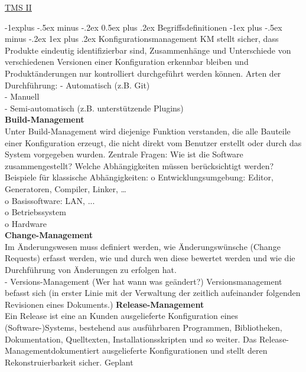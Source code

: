 \documentclass[5pt]{article}
\makeatletter
\renewcommand{\subsection}{\@startsection{subsection}{2}{0mm}%
                                {-1explus -.5ex minus -.2ex}%
                                {0.5ex plus .2ex}%
                                {\normalfont\normalsize\bfseries}}
\renewcommand{\subsubsection}{\@startsection{subsubsection}{3}{0mm}%
                                {-1ex plus -.5ex minus -.2ex}%
                                {1ex plus .2ex}%
                                {\normalfont\small\bfseries}}
\makeatother
\begin{document}
\raggedright
\footnotesize
\begin{multicols*}{4}


\setlength{\premulticols}{1pt}
\setlength{\postmulticols}{1pt}
\setlength{\multicolsep}{1pt}
\setlength{\columnsep}{2pt}

\begin{center}
     \Large{\underline{TMS II}} \\
 
\end{center}


\subsection{Begriffsdefinitionen}
\subsubsection{Konfigurationsmanagement}
KM stellt sicher, dass Produkte eindeutig identifizierbar sind, Zusammenhänge und Unterschiede von
verschiedenen Versionen einer Konfiguration erkennbar bleiben und Produktänderungen nur kontrolliert durchgeführt werden können.
Arten der Durchführung:
- Automatisch (z.B. Git)\\
- Manuell\\
- Semi-automatisch (z.B. unterstützende Plugins)\\
\textbf{Build-Management}\\
Unter Build-Management wird diejenige Funktion verstanden, die alle Bauteile einer Konfiguration
erzeugt, die nicht direkt vom Benutzer erstellt oder durch das System vorgegeben wurden. Zentrale Fragen: Wie ist die Software zusammengestellt? Welche Abhängigkeiten müssen berücksichtigt werden? Beispiele für klassische Abhängigkeiten:
o Entwicklungsumgebung: Editor, Generatoren, Compiler, Linker, …\\
o Basissoftware: LAN, ...\\
o Betriebssystem\\
o Hardware\\
\textbf{Change-Management}\\
Im Änderungswesen muss definiert werden, wie Änderungswünsche (Change Requests) erfasst
werden, wie und durch wen diese bewertet werden und wie die Durchführung von Änderungen
zu erfolgen hat.\\
- Versions-Management (Wer hat wann was geändert?)
Versionsmanagement befasst sich (in erster Linie mit der Verwaltung der zeitlich aufeinander folgenden Revisionen eines Dokuments.)
\textbf{Release-Management}\\
Ein Release ist eine an Kunden ausgelieferte Konfiguration eines (Software-)Systems, bestehend
aus ausführbaren Programmen, Bibliotheken, Dokumentation, Quelltexten, Installationsskripten
und so weiter. Das Release-Managementdokumentiert ausgelieferte Konfigurationen und stellt
deren Rekonstruierbarkeit sicher.
Geplant

\end{multicols*}
\end{document}
